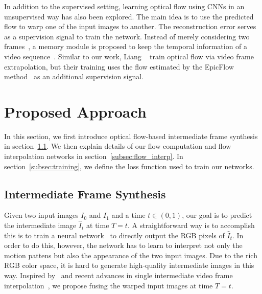 \documentclass[10pt,twocolumn,letterpaper]{article}
\newcommand{\DS}[1]{{\color{blue}DS: #1}}
\begin{document}
In addition to the supervised setting, learning optical flow using CNNs in an unsupervised way has also been explored. The main idea is to use the predicted flow to warp one of the input images to another. The reconstruction error serves as a supervision signal to train the network. Instead of merely considering two frames~\cite{yu16back}, a memory module is proposed to keep the temporal information of a video sequence~\cite{patraucean16spatio}. Similar to our work, Liang \etal~\cite{liang17dual} train optical flow via video frame extrapolation, but their training uses the flow estimated by the EpicFlow method~\cite{EpicFlow} as an additional supervision signal. 



\section{Proposed Approach}
In this section, we first introduce optical flow-based intermediate frame synthesis in section~\ref{subsec:frame_synth}. We then explain details of our flow computation and flow interpolation networks in section~\ref{subsec:flow_interp}. In section~\ref{subsec:training}, we define the loss function used to train our networks.

\subsection{Intermediate Frame Synthesis}
\label{subsec:frame_synth}
Given two input images $I_0$ and $I_1$ and a time $t\in(0, 1)$, our goal is to predict the intermediate image $\hat{I}_t$ at time $T=t$. 
A straightforward way is to accomplish this is to train a neural network~\cite{long16learning} to directly output the RGB pixels of $\hat{I}_t$. 
In order to do this, however, the network has to learn to interpret not only the motion pattens but also the appearance of the two input images. 
Due to the rich RGB color space, it is hard to generate high-quality intermediate images in this way. 
Inspired by~\cite{baker11a} and recent advances in single intermediate video frame interpolation~\cite{niklaus17video_cvpr,niklaus17video_iccv,liu17video}, we propose fusing the warped input images at time $T=t$. 
\end{document}
